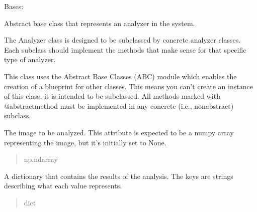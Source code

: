 \documentclass[letterpaper,10pt,english]{sphinxmanual}
\begin{document}
\begin{fulllineitems}
\label{\detokenize{forensicfit.core.analyzer:forensicfit.core.analyzer.Analyzer}}
\pysigstartsignatures
{}
\pysigstopsignatures
\sphinxAtStartPar
Bases: 

\sphinxAtStartPar
Abstract base class that represents an analyzer in the system.

\sphinxAtStartPar
The Analyzer class is designed to be subclassed by concrete analyzer classes.
Each subclass should implement the methods that make sense for that specific
type of analyzer.

\sphinxAtStartPar
This class uses the Abstract Base Classes (ABC) module which enables the
creation of a blueprint for other classes. This means you can’t create an
instance of this class, it is intended to be subclassed. All methods marked
with @abstractmethod must be implemented in any concrete (i.e.,
non\sphinxhyphen{}abstract) subclass.

\begin{fulllineitems}
\label{\detokenize{forensicfit.core.analyzer:forensicfit.core.analyzer.Analyzer.image}}
\pysigstartsignatures
{}
\pysigstopsignatures
\sphinxAtStartPar
The image to be analyzed. This attribute is expected to be a numpy
array representing the image, but it’s initially set to None.
\begin{quote}\begin{description}
\sphinxAtStartPar
np.ndarray

\end{description}\end{quote}

\end{fulllineitems}


\begin{fulllineitems}
\label{\detokenize{forensicfit.core.analyzer:forensicfit.core.analyzer.Analyzer.values}}
\pysigstartsignatures
{}
\pysigstopsignatures
\sphinxAtStartPar
A dictionary that contains the results of the analysis. The keys are
strings describing what each value represents.
\begin{quote}\begin{description}
\sphinxAtStartPar
dict


\end{description}
\end{quote}
\end{fulllineitems}
\end{fulllineitems}
\end{document}
